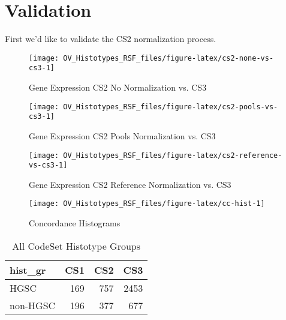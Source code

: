 \documentclass[
]{report}
\begin{document}
\hypertarget{validation}{%
\chapter{Validation}\label{validation}}

First we'd like to validate the CS2 normalization process.

\begin{figure}

{\centering \texttt{[image: OV\_Histotypes\_RSF\_files/figure-latex/cs2-none-vs-cs3-1]} 

}

\caption{Gene Expression CS2 No Normalization vs. CS3}\label{fig:cs2-none-vs-cs3}
\end{figure}

\begin{figure}

{\centering \texttt{[image: OV\_Histotypes\_RSF\_files/figure-latex/cs2-pools-vs-cs3-1]} 

}

\caption{Gene Expression CS2 Pools Normalization vs. CS3}\label{fig:cs2-pools-vs-cs3}
\end{figure}

\begin{figure}

{\centering \texttt{[image: OV\_Histotypes\_RSF\_files/figure-latex/cs2-reference-vs-cs3-1]} 

}

\caption{Gene Expression CS2 Reference Normalization vs. CS3}\label{fig:cs2-reference-vs-cs3}
\end{figure}

\begin{figure}

{\centering \texttt{[image: OV\_Histotypes\_RSF\_files/figure-latex/cc-hist-1]} 

}

\caption{Concordance Histograms}\label{fig:cc-hist}
\end{figure}

\begin{table}

\caption{\label{tab:dist-all-gr}All CodeSet Histotype Groups}
\centering
\begin{tabular}[t]{l|r|r|r}
\hline
hist\_gr & CS1 & CS2 & CS3\\
\hline
HGSC & 169 & 757 & 2453\\
\hline
non-HGSC & 196 & 377 & 677\\
\hline
\end{tabular}
\end{table}
\end{document}
